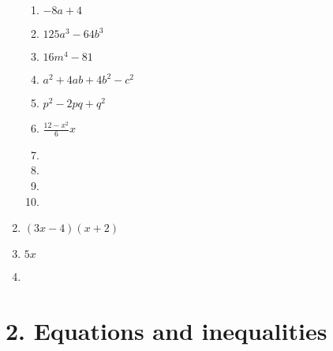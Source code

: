 \begin{enumerate}[itemsep=5pt, label=\textbf{\arabic*}. ]
\begin{multicols}{2}
\begin{enumerate}[itemsep=5pt, label=\textbf{(\alph*)} ]
\item$-8a + 4$%
\item $125a^3 - 64b^3$ %
\item $16m^4 - 81$%
\item $a^2 + 4ab + 4b^2 - c^2$%
\item $p^2 - 2pq +q^2$%
\item $\frac{12 - x^2}{6}x$%
\item %
\item %
\item %
\item %
\end{enumerate}
\end{multicols}

\item $(3x - 4)(x + 2)$%
\item $5x$%
\item %
\end{enumerate}




\section {2. Equations and inequalities}

